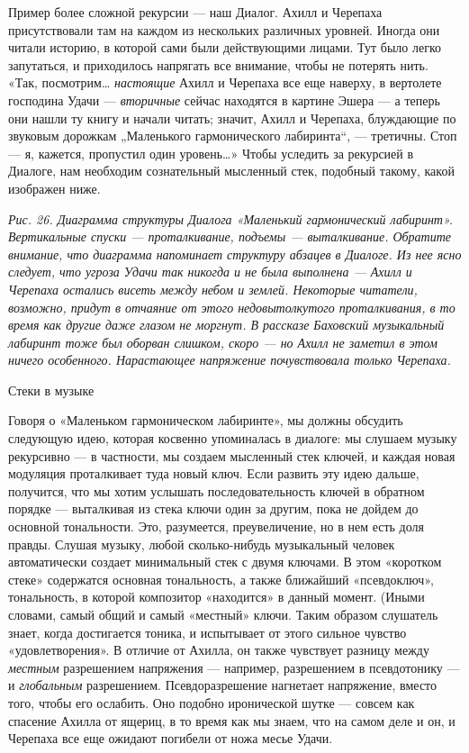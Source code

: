 Пример более сложной рекурсии --- наш Диалог. Ахилл и Черепаха присутствовали там на каждом из нескольких различных уровней. Иногда они читали историю, в которой сами были действующими лицами. Тут было легко запутаться, и приходилось напрягать все внимание, чтобы не потерять нить. «Так, посмотрим\ldots{} \emph{настоящие} Ахилл и Черепаха все еще наверху, в вертолете господина Удачи --- \emph{вторичные} сейчас находятся в картине Эшера --- а теперь они нашли ту книгу и начали читать; значит, Ахилл и Черепаха, блуждающие по звуковым дорожкам „Маленького гармонического лабиринта``, --- третичны. Стоп --- я, кажется, пропустил один уровень\ldots» Чтобы уследить за рекурсией в Диалоге, нам необходим сознательный мысленный стек, подобный такому, какой изображен ниже.

\emph{Рис. 26. Диаграмма структуры Диалога «Маленький гармонический лабиринт». Вертикальные спуски --- проталкивание, подъемы --- выталкивание. Обратите внимание, что диаграмма напоминает структуру абзацев в Диалоге. Из нее ясно следует, что угроза Удачи так никогда и не была выполнена --- Ахилл и Черепаха остались висеть между небом и землей. Некоторые читатели, возможно, придут в отчаяние от этого недовытолкутого проталкивания, в то время как другие даже глазом не моргнут. В рассказе Баховский музыкальный лабиринт тоже был оборван слишком, скоро --- но Ахилл не заметил в этом ничего особенного. Нарастающее напряжение почувствовала только Черепаха.}

Стеки в музыке

Говоря о «Маленьком гармоническом лабиринте», мы должны обсудить следующую идею, которая косвенно упоминалась в диалоге: мы слушаем музыку рекурсивно --- в частности, мы создаем мысленный стек ключей, и каждая новая модуляция проталкивает туда новый ключ. Если развить эту идею дальше, получится, что мы хотим услышать последовательность ключей в обратном порядке --- выталкивая из стека ключи один за другим, пока не дойдем до основной тональности. Это, разумеется, преувеличение, но в нем есть доля правды. Слушая музыку, любой сколько-нибудь музыкальный человек автоматически создает минимальный стек с двумя ключами. В этом «коротком стеке» содержатся основная тональность, а также ближайший «псевдоключ», тональность, в которой композитор «находится» в данный момент. (Иными словами, самый общий и самый «местный» ключи. Таким образом слушатель знает, когда достигается тоника, и испытывает от этого сильное чувство «удовлетворения». В отличие от Ахилла, он также чувствует разницу между \emph{местным} разрешением напряжения --- например, разрешением в псевдотонику --- и \emph{глобальным} разрешением. Псевдоразрешение нагнетает напряжение, вместо того, чтобы его ослабить. Оно подобно иронической шутке --- совсем как спасение Ахилла от ящериц, в то время как мы знаем, что на самом деле и он, и Черепаха все еще ожидают погибели от ножа месье Удачи.

